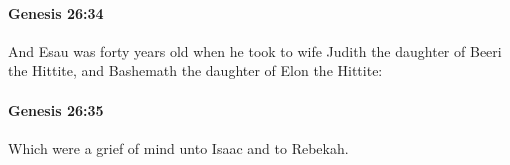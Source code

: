 		\paragraph{Genesis 26:34} %
			\label{GENESIS-26-34}

			And Esau was forty years old when he took to wife Judith the daughter of Beeri the Hittite, and Bashemath the daughter of Elon the Hittite:


		\paragraph{Genesis 26:35} %
			\label{GENESIS-26-35}

			Which were a grief of mind unto Isaac and to Rebekah.

